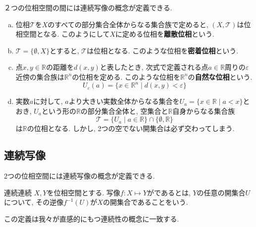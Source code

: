 \documentclass[../main.tex]{subfiles}
\begin{document}
        \begin{exm}{}{}
            ２つの位相空間の間には連続写像の概念が定義できる.
            \begin{enumerate}[(a)]
                \item 位相$\mathcal{T}$を$X$のすべての部分集合全体からなる集合族で定めると, $(X,\mathcal{T})$は位相空間となる.
                        このようにして$X$に定める位相を\textbf{離散位相}という.
                \item $\mathcal{T}=\{\emptyset, X\}$とすると, $\mathcal{T}$は位相となる.
                        このような位相を\textbf{密着位相}という.
                \item 点$x,y\in\mathbb{R}$の距離を$d(x,y)$と表したとき, 次式で定義される点$a \in \mathbb{R}$周りの$\varepsilon$近傍の集合族は$\mathbb{R}^n$の位相を定める.
                        このような位相を$\mathbb{R}^n$の\textbf{自然な位相}という.
                            \begin{equation*}
                                U_\varepsilon(a) = \{x \in \mathbb{R}^n \mid d(x,y)<\varepsilon\}
                            \end{equation*}
                \item 実数$a$に対して, $a$より大きい実数全体からなる集合を$U_a = \{x\in\mathbb{R} \mid a<x\}$とおき,
                        $U_a$という形の$\mathbb{R}$の部分集合全体と, 空集合と$\mathbb{R}$自身からなる集合族
                            \begin{equation*}
                                \mathcal{T} = \{U_a \mid a\in\mathbb{R}\} \cap \{\emptyset, \mathbb{R}\}
                            \end{equation*}
                        は$\mathbb{R}$の位相となる. しかし, 2つの空でない開集合は必ず交わってしまう.
            \end{enumerate}
        \end{exm}

    \subsection{連続写像}
        2つの位相空間には連続写像の概念が定義できる.
        \begin{dfn}[label=dfn:continuous map]{連続}{連続}
            $X,Y$を位相空間とする. 写像$f:X \mapsto Y$がであるとは, $Y$の任意の開集合$U$について, その逆像$f^{-1}(U)$が$X$の開集合であることをいう.
        \end{dfn}
        この定義は我々が直感的にもつ連続性の概念に一致する.
\end{document}
